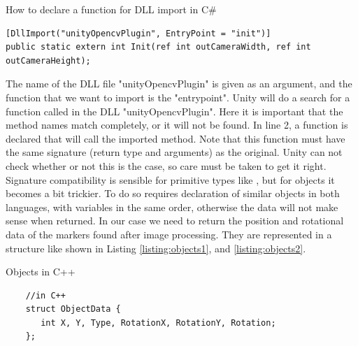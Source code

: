 \begin{listing}[H]
	\caption{How to declare a function for DLL import in C\#}
	\label{listing:dllImport}
	\begin{verbatim}
[DllImport("unityOpencvPlugin", EntryPoint = "init")]
public static extern int Init(ref int outCameraWidth, ref int outCameraHeight);
	\end{verbatim}
\end{listing}
The name of the DLL file "unityOpencvPlugin" is given as an argument, and the function that we want to import is the "entrypoint". Unity will do a search for a function called  in the DLL "unityOpencvPlugin". Here it is important that the method names match completely, or it will not be found. In line 2, a function is declared that will call the imported method. Note that this function must have the same signature (return type and arguments) as the original. Unity can not check whether or not this is the case, so care must be taken to get it right. Signature compatibility is sensible for primitive types like , but for objects it becomes a bit trickier. To do so requires declaration of similar objects in both languages, with variables in the same order, otherwise the data will not make sense when returned. In our case we need to return the position and rotational data of the markers found after image processing. They are represented in a structure like shown in Listing \ref{listing:objects1}, and \ref{listing:objects2}. 
\begin{listing}[H]
	\caption{Objects in C++}
	\label{listing:objects1}
	\begin{verbatim}
	//in C++
	struct ObjectData {
	   int X, Y, Type, RotationX, RotationY, Rotation;
	};
	\end{verbatim}
\end{listing}

